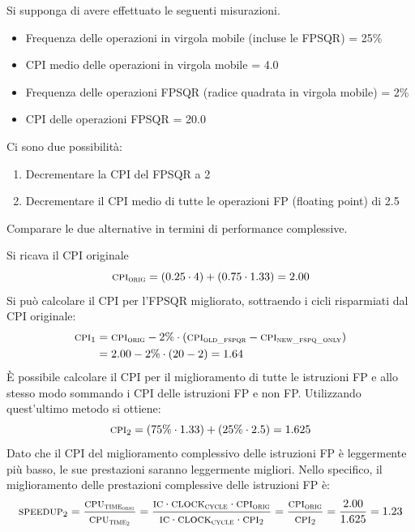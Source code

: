\begin{exercise}
	Si supponga di avere effettuato le seguenti  misurazioni.
	\begin{itemize}
		\item Frequenza delle operazioni in virgola mobile (incluse le FPSQR) = 25\%
		\item CPI medio delle operazioni in virgola mobile = 4.0
		\item Frequenza delle operazioni FPSQR (radice quadrata in virgola mobile) = 2\%
		\item CPI delle operazioni FPSQR = 20.0
	\end{itemize}
	Ci sono due possibilità:
	\begin{enumerate}
		\item Decrementare la CPI del FPSQR a 2
		\item Decrementare il CPI medio di tutte le operazioni FP (floating point) di 2.5
	\end{enumerate}
	Comparare le due alternative in termini di performance complessive.
\end{exercise}
\begin{solution}
	Si ricava il CPI originale
	\begin{equation*}
		\textsc{cpi}_{\textsc{orig}}=(0.25\cdot 4)+(0.75 \cdot 1.33)=2.00
	\end{equation*}
	Si può calcolare il CPI per l'FPSQR migliorato, sottraendo i cicli risparmiati dal CPI originale:
	\begin{align*}
		\textsc{cpi}_1 &= \textsc{cpi}_{\textsc{orig}}-2\% \cdot \left(\textsc{cpi}_{\textsc{old\_fspqr}}-\textsc{cpi}_\textsc{new\_fspq\_only}\right)\\&=2.00-2\%\cdot(20-2)=1.64
	\end{align*}
	È possibile calcolare il CPI per il miglioramento di tutte le istruzioni FP e allo stesso modo sommando i CPI delle istruzioni FP e non FP. Utilizzando quest'ultimo metodo si ottiene:
	\begin{equation*}
		\textsc{cpi}_2 = \left(75\% \cdot 1.33\right)+(25\% \cdot 2.5) = 1.625
	\end{equation*}
	Dato che il CPI del miglioramento complessivo delle istruzioni FP è leggermente più basso, le sue prestazioni saranno leggermente migliori. Nello specifico, il miglioramento delle prestazioni complessive delle istruzioni FP è:
	\begin{align*}
			\textsc{speedup}_2 = \frac{\textsc{cpu\textsubscript{time\textsubscript{orig}}}}{\textsc{cpu\textsubscript{time\textsubscript{2}}}}= \frac{\textsc{ic}\cdot \textsc{clock\textsubscript{cycle}}\cdot \textsc{cpi}\textsubscript{\textsc{orig}}}{\textsc{ic}\cdot \textsc{clock\textsubscript{cycle}}\cdot \textsc{cpi}\textsubscript{\textsc{2}}}=\frac{\textsc{cpi\textsubscript{orig}}}{\textsc{cpi\textsubscript{2}}}=\frac{2.00}{1.625}=1.23
	\end{align*}
\end{solution}

